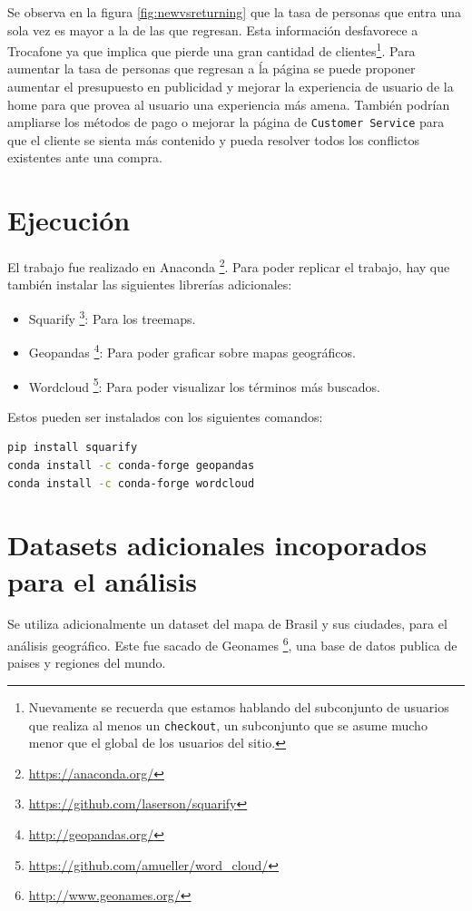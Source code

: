 \documentclass[a4paper]{article}
\begin{document}
Se observa en la figura \ref{fig:newvsreturning} que la tasa de personas que entra una sola vez es mayor a la de las que regresan. Esta información desfavorece a Trocafone ya que implica que pierde una gran cantidad de clientes\footnote{Nuevamente se recuerda que estamos hablando del subconjunto de usuarios que realiza al menos un \texttt{checkout}, un subconjunto que se asume mucho menor que el global de los usuarios del sitio.}. Para aumentar la tasa de personas que regresan a ĺa página se puede proponer aumentar el presupuesto en publicidad y mejorar la experiencia de usuario de la home para que provea al usuario una experiencia más amena. También podrían ampliarse los métodos de pago o mejorar la página de \texttt{Customer Service} para que el cliente se sienta más contenido y pueda resolver todos los conflictos existentes ante una compra.

\newpage
\appendix

\section{Ejecución}

El trabajo fue realizado en Anaconda \footnote{\url{https://anaconda.org/}}. Para poder replicar el trabajo, hay que también instalar las siguientes librerías adicionales:

\begin{itemize}
	\item{Squarify \footnote{\url{https://github.com/laserson/squarify}}: Para los treemaps.}
	\item{Geopandas \footnote{\url{http://geopandas.org/}}: Para poder graficar sobre mapas geográficos.}
	\item{Wordcloud \footnote{\url{https://github.com/amueller/word_cloud/}}: Para poder visualizar los términos más buscados.}
\end{itemize}

Estos pueden ser instalados con los siguientes comandos: 
\begin{lstlisting}[language=sh]
pip install squarify
conda install -c conda-forge geopandas
conda install -c conda-forge wordcloud
\end{lstlisting}

\section{Datasets adicionales incoporados para el análisis}

Se utiliza adicionalmente un dataset del mapa de Brasil y sus ciudades, para el análisis geográfico. Este fue sacado de  Geonames \footnote{\url{http://www.geonames.org/}}, una base de datos publica de paises y regiones del mundo.
\end{document}
